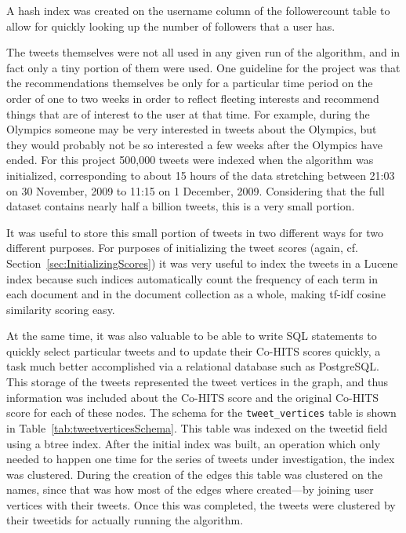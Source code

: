 \noindent
A hash index was created on the username column of the followercount table to allow for quickly looking up the number of followers that a user has.


The tweets themselves were not all used in any given run of the algorithm, and in fact only a tiny portion of them were used. One guideline for the project was that the recommendations themselves be only for a particular time period on the order of one to two weeks in order to reflect fleeting interests and recommend things that are of interest to the user at that time. For example, during the Olympics someone may be very interested in tweets about the Olympics, but they would probably not be so interested a few weeks after the Olympics have ended. For this project 500,000 tweets were indexed when the algorithm was initialized, corresponding to about 15 hours of the data stretching between 21:03 on 30 November, 2009 to 11:15 on 1 December, 2009. Considering that the full dataset contains nearly half a billion tweets, this is a very small portion.

It was useful to store this small portion of tweets in two different ways for two different purposes. For purposes of initializing the tweet scores (again, cf. Section~\ref{sec:InitializingScores}) it was very useful to index the tweets in a Lucene index because such indices automatically count the frequency of each term in each document and in the document collection as a whole, making tf-idf cosine similarity scoring easy.

At the same time, it was also valuable to be able to write SQL statements to quickly select particular tweets and to update their Co-HITS scores quickly, a task much better accomplished via a relational database such as PostgreSQL. This storage of the tweets represented the tweet vertices in the graph, and thus information was included about the Co-HITS score and the original Co-HITS score for each of these nodes. The schema for the \texttt{tweet\_vertices} table is shown in Table~\ref{tab:tweetverticesSchema}. This table was indexed on the tweetid field using a btree index. After the initial index was built, an operation which only needed to happen one time for the series of tweets under investigation, the index was clustered. During the creation of the edges this table was clustered on the names, since that was how most of the edges where created---by joining user vertices with their tweets. Once this was completed, the tweets were clustered by their tweetids for actually running the algorithm.

